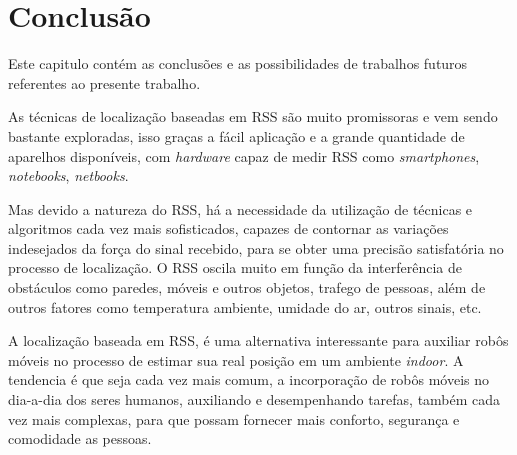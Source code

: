 \chapter{Conclusão}
\label{conclusao}
\begin{comment}
  Os robôs vem sendo muito utilizados na automatização de tarefas, e nesse trabalho 
  podemos perceber que  uma tarefa simples, como deslocar um robô de um lugar a outro, 
  de forma autônoma, exige técnicas complexas de estatística e de várias áreas da 
  computação como inteligência artificial, geometria computacional e processamento de 
  imagens.
  
    O conceito por trás desse trabalho é muito promissor, pois, a idéia de poder clicar em um mapa, ou falar o endereço onde você deseja ir,
    e seu celular ou tablet dirige seu carro para você, sem precisar tocar no volante, é extremamente interessante.
\end{comment}
    Este capitulo contém as conclusões e as possibilidades de trabalhos futuros referentes ao presente 
    trabalho.
  
   As técnicas de localização baseadas em RSS são muito promissoras e 
  vem sendo bastante exploradas, isso graças a fácil aplicação e a grande 
  quantidade de aparelhos disponíveis, 
  com \textit{hardware} capaz de medir RSS como \textit{smartphones}, \textit{notebooks}, \textit{netbooks}.
  
   Mas devido a natureza do RSS, há a necessidade da utilização de técnicas e 
  algoritmos cada vez mais sofisticados, capazes de contornar as variações indesejados
  da força do sinal recebido, para se obter uma precisão satisfatória no processo de 
  localização. O RSS oscila muito em função da interferência 
   de obstáculos como paredes, 
   móveis e outros objetos, trafego de pessoas, além de outros fatores como temperatura ambiente, 
   umidade do ar, outros sinais, etc.
  
   A localização baseada em RSS, é uma alternativa interessante para auxiliar robôs móveis
   no processo de estimar sua real posição em um ambiente \textit{indoor}. A tendencia é que 
   seja cada vez mais comum, a incorporação de robôs móveis no dia-a-dia dos seres humanos,
   auxiliando e desempenhando tarefas, também cada vez mais complexas, para que possam 
   fornecer mais conforto, segurança e comodidade as pessoas.
   
